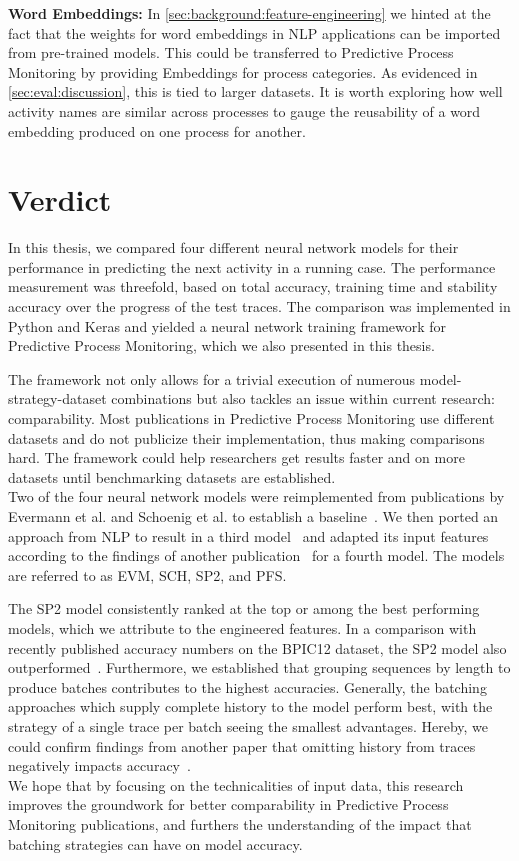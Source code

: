 \noindent\textbf{Word Embeddings:} In \autoref{sec:background:feature-engineering} we hinted at the fact that the weights for word embeddings in NLP applications can be imported from pre-trained models. This could be transferred to Predictive Process Monitoring by providing Embeddings for process categories. As evidenced in \autoref{sec:eval:discussion}, this is tied to larger datasets. It is worth exploring how well activity names are similar across processes to gauge the reusability of a word embedding produced on one process for another.

\section{Verdict} \label{sec:conclusion:verdict}
In this thesis, we compared four different neural network models for their performance in predicting the next activity in a running case. The performance measurement was threefold, based on total accuracy, training time and stability accuracy over the progress of the test traces. The comparison was implemented in Python and Keras and yielded a neural network training framework for Predictive Process Monitoring, which we also presented in this thesis.

The framework not only allows for a trivial execution of numerous model-strategy-dataset combinations but also tackles an issue within current research: comparability. Most publications in Predictive Process Monitoring use different datasets and do not publicize their implementation, thus making comparisons hard. The framework could help researchers get results faster and on more datasets until benchmarking datasets are established.\\

Two of the four neural network models were reimplemented from publications by Evermann et al. and Schoenig et al. to establish a baseline~\cite{evermann2016, schoenig2018}. We then ported an approach from NLP to result in a third model~\cite{shibata2016bipartite} and adapted its input features according to the findings of another publication~\cite{klinkmuller2018reliablemonitoring} for a fourth model. The models are referred to as EVM, SCH, SP2, and PFS.

The SP2 model consistently ranked at the top or among the best performing models, which we attribute to the engineered features. In a comparison with recently published accuracy numbers on the BPIC12 dataset, the SP2 model also outperformed~\cite{boehmer2018probability, evermann2016}. Furthermore, we established that grouping sequences by length to produce batches contributes to the highest accuracies. Generally, the batching approaches which supply complete history to the model perform best, with the strategy of a single trace per batch seeing the smallest advantages. Hereby, we could confirm findings from another paper that omitting history from traces negatively impacts accuracy~\cite{klinkmuller2018reliablemonitoring}.\\

We hope that by focusing on the technicalities of input data, this research improves the groundwork for better comparability in Predictive Process Monitoring publications, and furthers the understanding of the impact that batching strategies can have on model accuracy.
